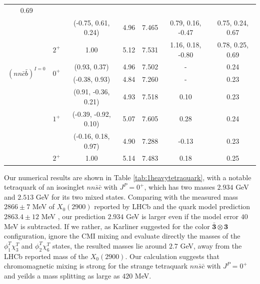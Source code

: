 \documentclass[prd,twocolumn,floatfix,nofootinbib]{revtex4}
\begin{document}
\begin{table}[!htb]
\begin{tabular}{ccccccc}
0.69 \\
&  & (-0.75, 0.61, 0.24) & 4.96 & 7.465 & 0.79, 0.16, -0.47 & 0.75, 0.24,
0.67 \\
& $2^{+}$ & 1.00 & 5.12 & 7.531 & 1.16, 0.18, -0.80 & 0.78, 0.25, 0.69 \\
\multirow{2}{*}{${(nn\bar{c}\bar{b})}^{I=0}$} & \multirow{2}{*}{$0^{+}$} &
(0.93, 0.37) & 4.96 & 7.502 & - & 0.24 \\
&  & (-0.38, 0.93) & 4.84 & 7.260 & - & 0.23 \\
& \multirow{3}{*}{$1^{+}$} & (0.91, -0.36, 0.21) & 4.93 & 7.518 & 0.10 & 0.23
\\
&  & (-0.39, -0.92, 0.10) & 5.07 & 7.605 & 0.28 & 0.24 \\
&  & (-0.16, 0.18, 0.97) & 4.90 & 7.288 & -0.13 & 0.23 \\
& $2^{+}$ & 1.00 & 5.14 & 7.483 & 0.18 & 0.25 \\ \hline\hline
\end{tabular}%
\end{table}

Our numerical results are shown in Table \ref{tab:1heavytetraquark}, with a
notable tetraquark of an isosinglet $nn\bar{s}\bar{c}$ with $J^{P}=0^{+}$,
which has two masses $2.934$ GeV and $2.513$ GeV for its two mixed states.
Comparing with the measured mass $2866\pm 7$ MeV of $X_{0}(2900)$ reported
by LHCb\cite{LHCb:2020kd} and the quark model prediction $2863.4\pm 12$ MeV%
\cite{Karliner:2020vsi}, our prediction $2.934$ GeV is larger even if the
model error $40$ MeV is subtracted. If we rather, as Karliner suggested for
the color $\boldsymbol{\bar{3}}\otimes \boldsymbol{3}$ configuration, ignore
the CMI mixing and evaluate directly the masses of the $\phi _{1}^{T}\chi
_{3}^{T}$ and $\phi _{2}^{T}\chi _{6}^{T}$ states, the resulted masses lie
around $2.7$ GeV, away from the LHCb reported mass of the $X_{0}(2900)$. Our
calculation suggests that chromomagnetic mixing is strong for the strange
tetraquark $nn\bar{s}\bar{c}$ with $J^{P}=0^{+}$ and yeilds a mass splitting
as large as $420$ MeV.
\end{document}
